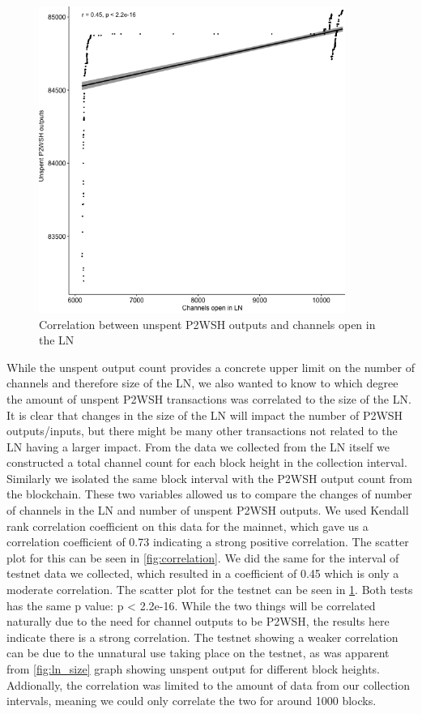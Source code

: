 \begin{figure}[h]
    \centering
    \includegraphics[width=10cm]{figures/graphs/channel_p2wsh_correlation_testnet.png}
    \caption{Correlation between unspent P2WSH outputs and channels open in the LN}
    \label{fig:correlation_testnet}
\end{figure}

While the unspent output count provides a concrete upper limit on the number of channels and therefore size of the LN, we also wanted to know to which degree the amount of unspent P2WSH transactions was correlated to the size of the LN. It is clear that changes in the size of the LN will impact the number of P2WSH outputs/inputs, but there might be many other transactions not related to the LN having a larger impact. From the data we collected from the LN itself we constructed a total channel count for each block height in the collection interval. Similarly we isolated the same block interval with the P2WSH output count from the blockchain. These two variables allowed us to compare the changes of number of channels in the LN and number of unspent P2WSH outputs. We used Kendall rank correlation coefficient on this data for the mainnet, which gave us a correlation coefficient of 0.73 indicating a strong positive correlation. The scatter plot for this can be seen in \cref{fig:correlation}.
We did the same for the interval of testnet data we collected, which resulted in a coefficient of 0.45 which is only a moderate correlation. 
The scatter plot for the testnet can be seen in \cref{fig:correlation_testnet}.
Both tests has the same p value: p < 2.2e-16. 
While the two things will be correlated naturally due to the need for channel outputs to be P2WSH, the results here indicate there is a strong correlation. The testnet showing a weaker correlation can be due to the unnatural use taking place on the testnet, as was apparent from \cref{fig:ln_size} graph showing unspent output for different block heights. Addionally, the correlation was limited to the amount of data from our collection intervals, meaning we could only correlate the two for around 1000 blocks.

